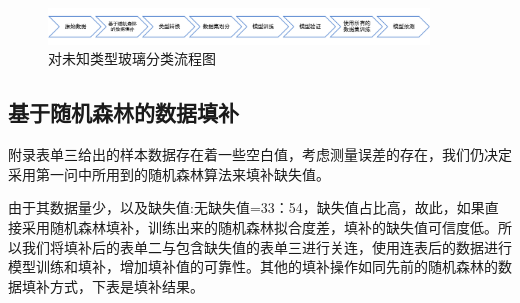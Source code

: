 \documentclass[UTF8]{ctexart}
\begin{document}
\begin{figure}[H]\centering
	\includegraphics[width=0.9\textwidth]{img/第三问流程图.png} %
	\caption{对未知类型玻璃分类流程图} %
	\label{fig:figure 7} %
\end{figure}

\subsection{基于随机森林的数据填补}
附录表单三给出的样本数据存在着一些空白值，考虑测量误差的存在，我们仍决定采用第一问中所用到的随机森林算法来填补缺失值。

由于其数据量少，以及缺失值:无缺失值=33：54，缺失值占比高，故此，如果直接采用随机森林填补，训练出来的随机森林拟合度差，填补的缺失值可信度低。所以我们将填补后的表单二与包含缺失值的表单三进行关连，使用连表后的数据进行模型训练和填补，增加填补值的可靠性。其他的填补操作如同先前的随机森林的数据填补方式，下表是填补结果。
\end{document}
